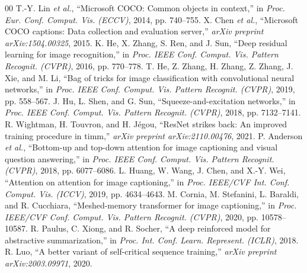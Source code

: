 \documentclass[conference]{IEEEtran}
\begin{document}
\begin{thebibliography}{00}
 T.-Y. Lin \textit{et al.}, ``Microsoft COCO: Common objects in context,'' in \textit{Proc. Eur. Conf. Comput. Vis. (ECCV)}, 2014, pp. 740--755.
 X. Chen \textit{et al.}, ``Microsoft COCO captions: Data collection and evaluation server,'' \textit{arXiv preprint arXiv:1504.00325}, 2015.
 K. He, X. Zhang, S. Ren, and J. Sun, ``Deep residual learning for image recognition,'' in \textit{Proc. IEEE Conf. Comput. Vis. Pattern Recognit. (CVPR)}, 2016, pp. 770--778.
 T. He, Z. Zhang, H. Zhang, Z. Zhang, J. Xie, and M. Li, ``Bag of tricks for image classification with convolutional neural networks,'' in \textit{Proc. IEEE Conf. Comput. Vis. Pattern Recognit. (CVPR)}, 2019, pp. 558--567.
 J. Hu, L. Shen, and G. Sun, ``Squeeze-and-excitation networks,'' in \textit{Proc. IEEE Conf. Comput. Vis. Pattern Recognit. (CVPR)}, 2018, pp. 7132--7141.
 R. Wightman, H. Touvron, and H. J\'egou, ``ResNet strikes back: An improved training procedure in timm,'' \textit{arXiv preprint arXiv:2110.00476}, 2021.
 P. Anderson \textit{et al.}, ``Bottom-up and top-down attention for image captioning and visual question answering,'' in \textit{Proc. IEEE Conf. Comput. Vis. Pattern Recognit. (CVPR)}, 2018, pp. 6077--6086.
 L. Huang, W. Wang, J. Chen, and X.-Y. Wei, ``Attention on attention for image captioning,'' in \textit{Proc. IEEE/CVF Int. Conf. Comput. Vis. (ICCV)}, 2019, pp. 4634--4643.
 M. Cornia, M. Stefanini, L. Baraldi, and R. Cucchiara, ``Meshed-memory transformer for image captioning,'' in \textit{Proc. IEEE/CVF Conf. Comput. Vis. Pattern Recognit. (CVPR)}, 2020, pp. 10578--10587.
 R. Paulus, C. Xiong, and R. Socher, ``A deep reinforced model for abstractive summarization,'' in \textit{Proc. Int. Conf. Learn. Represent. (ICLR)}, 2018.
 R. Luo, ``A better variant of self-critical sequence training,'' \textit{arXiv preprint arXiv:2003.09971}, 2020.
\end{thebibliography}
\end{document}
